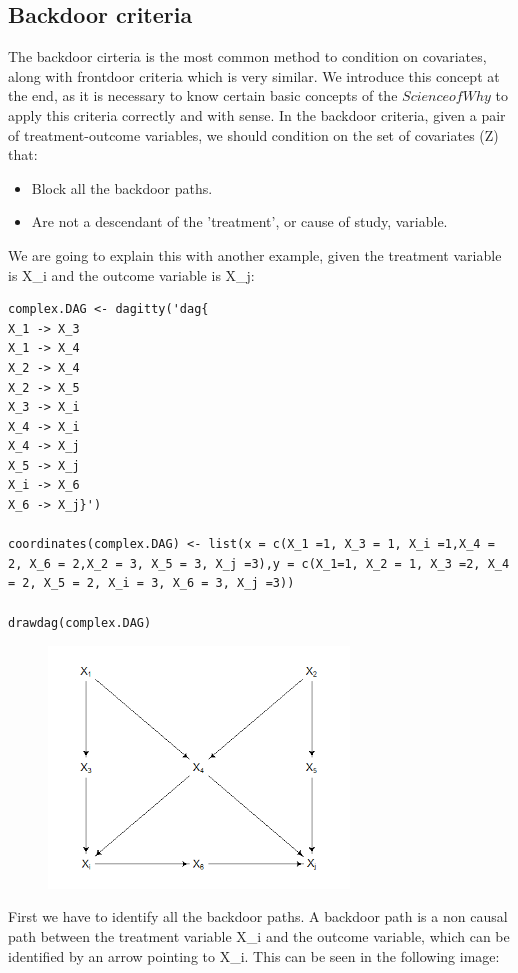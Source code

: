 \documentclass{article}
\begin{document}
\subsection{Backdoor criteria}
The backdoor cirteria is the most common method to condition on covariates, along with frontdoor criteria which is very similar.
We introduce this concept at the end, as it is necessary to know certain basic concepts of the \(Science of Why\) to apply this criteria correctly and with sense.
In the backdoor criteria, given a pair of treatment-outcome variables, we should condition on the set of covariates (Z) that:
\begin{itemize} \item Block all the backdoor paths. \item Are not a descendant of the 'treatment', or cause of study, variable.\end{itemize}
We are going to explain this with another example, given the treatment variable is X\_i and the outcome variable is X\_j:
\begin{lstlisting}
complex.DAG <- dagitty('dag{
X_1 -> X_3
X_1 -> X_4
X_2 -> X_4
X_2 -> X_5
X_3 -> X_i
X_4 -> X_i
X_4 -> X_j
X_5 -> X_j
X_i -> X_6
X_6 -> X_j}')

coordinates(complex.DAG) <- list(x = c(X_1 =1, X_3 = 1, X_i =1,X_4 = 2, X_6 = 2,X_2 = 3, X_5 = 3, X_j =3),y = c(X_1=1, X_2 = 1, X_3 =2, X_4 = 2, X_5 = 2, X_i = 3, X_6 = 3, X_j =3))

drawdag(complex.DAG)
\end{lstlisting}
\begin{figure}[h]
\includegraphics[width=8cm]{complex.DAG.png}
\centering
\end{figure}
First we have to identify all the backdoor paths. A backdoor path is a non causal path between the treatment variable X\_i and the outcome variable, which can be identified by an arrow pointing to X\_i. This can be seen in the following image:
\end{document}
